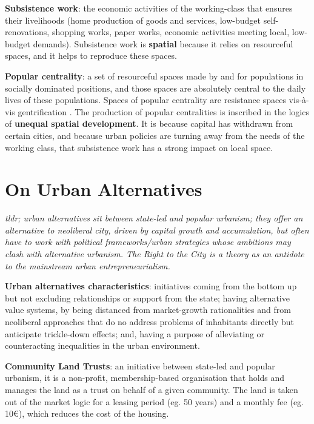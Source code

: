 \documentclass{article}
\newcommand{\alignedmarginpar}[1]{%
        \marginpar{\raggedright\small #1}
    }
\begin{document}
\textbf{Subsistence work}: the economic activities of the working-class that ensures their livelihoods (home production of goods and services, low-budget self-renovations, shopping works, paper works, economic activities meeting local, low-budget demands). Subsistence work is \textbf{spatial} because it relies on resourceful spaces, and it helps to reproduce these spaces. 

\textbf{Popular centrality}: a set of resourceful spaces made by and for populations in socially dominated positions, and those spaces are absolutely central to the daily lives of these populations. Spaces of popular centrality are resistance spaces vis-à-vis gentrification\alignedmarginpar{Marolles}. The production of popular centralities is inscribed in the logics of \textbf{unequal spatial development}. It is because capital has withdrawn from certain cities, and because urban policies are turning away from the needs of the working class, that subsistence work has a strong impact on local space.

\pagebreak
\section{On Urban Alternatives}

\textit{tldr; urban alternatives sit between state-led and popular urbanism; they offer an alternative to neoliberal city, driven by capital growth and accumulation, but often have to work with political frameworks/urban strategies whose ambitions may clash with alternative urbanism. The Right to the City is a theory as an antidote to the mainstream urban entrepreneurialism.}

\textbf{Urban alternatives characteristics}: initiatives coming from the bottom up\alignedmarginpar{Grassroots, citizen-led} but not excluding relationships or support from the state; having alternative value systems, by being distanced from market-growth rationalities\alignedmarginpar{NGO} and from neoliberal approaches that do no address problems of inhabitants directly but anticipate trickle-down effects; and, having a purpose of alleviating or counteracting inequalities in the urban environment.

\textbf{Community Land Trusts}: an initiative between state-led and popular urbanism, it is a non-profit, membership-based organisation that holds and manages the land as a trust on behalf of a given community. The land is taken out of the market logic for a leasing period (eg. 50 years) and a monthly fee (eg. 10€), which reduces the cost of the housing.
\end{document}
